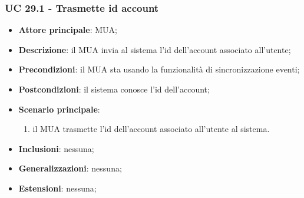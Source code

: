     \subsubsection{UC 29.1 - Trasmette id account} \label{sec:UC29.1}
    \begin{itemize}
        \item \textbf{Attore principale}: MUA;
        \item \textbf{Descrizione}: il MUA invia al sistema l'id dell'account associato all'utente;
        \item \textbf{Precondizioni}: il MUA sta usando la funzionalità di sincronizzazione eventi;
        \item \textbf{Postcondizioni}: il sistema conosce l'id dell'account;
        \item \textbf{Scenario principale}:
            \begin{enumerate}
                \item il MUA trasmette l'id dell'account associato all'utente al sistema.
            \end{enumerate}
        \item \textbf{Inclusioni}: nessuna;
        \item \textbf{Generalizzazioni}: nessuna;
        \item \textbf{Estensioni}: nessuna;
    \end{itemize}

